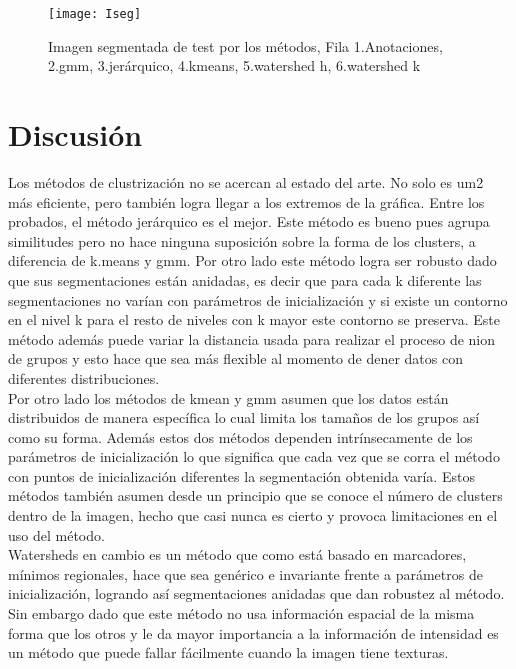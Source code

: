 \documentclass[10pt,twocolumn,letterpaper]{article}
\begin{document}
\begin{figure*}[t]
    \centering
 \texttt{[image: Iseg]}
    \caption{Imagen segmentada de test por los métodos, Fila 1.Anotaciones, 2.gmm, 3.jerárquico, 4.kmeans, 5.watershed h, 6.watershed k}
\label{fig:Iseg}
\end{figure*} 

\section{Discusión}
Los métodos de clustrización no se acercan al estado del arte. No solo es um2 más eficiente, pero también logra llegar a los extremos de la gráfica. Entre los probados, el método jerárquico es el mejor. Este método es bueno pues agrupa similitudes pero no hace ninguna suposición sobre la forma de los clusters, a diferencia de k.means y gmm. Por otro lado este método logra ser robusto dado que sus segmentaciones están anidadas, es decir que para cada k diferente las segmentaciones no varían con parámetros de inicialización y si existe un contorno en el nivel k para el resto de niveles con k mayor este contorno se preserva.  Este método además puede variar la distancia usada para realizar el proceso de nion de grupos y esto hace que sea más flexible al momento de dener datos con diferentes distribuciones.\\
Por otro lado los métodos de kmean y gmm asumen que los datos están distribuidos de manera específica lo cual limita los tamaños de los grupos así como su forma. Además estos dos métodos dependen intrínsecamente de los parámetros de inicialización lo que significa que cada vez que se corra el método con puntos de inicialización diferentes la segmentación obtenida varía. Estos métodos también asumen desde un principio que se conoce el número de clusters dentro de la imagen, hecho que casi nunca es cierto y provoca limitaciones en el uso del método.\\ %
Watersheds en cambio es un método que como está basado en marcadores, mínimos regionales, hace que sea genérico e invariante frente a parámetros de inicialización, logrando así segmentaciones anidadas que dan robustez al método. Sin embargo dado que este método no usa información espacial de la misma forma que los otros y le da mayor importancia a la información de intensidad es un método que puede fallar fácilmente cuando la imagen tiene texturas.\\ 
\end{document}
